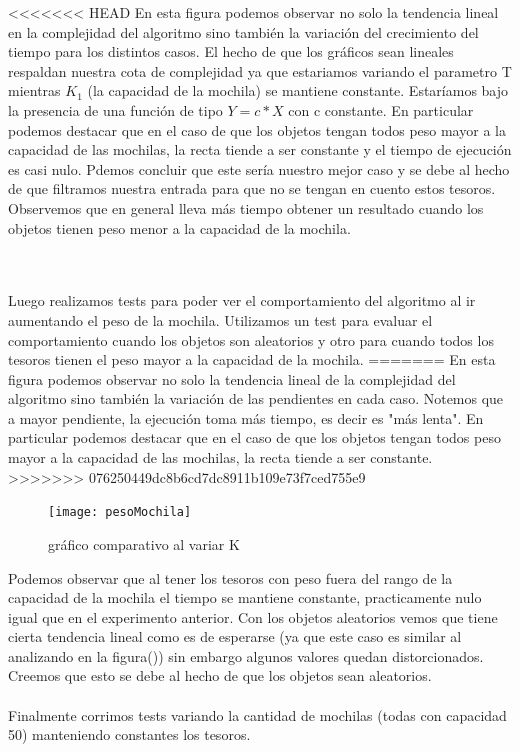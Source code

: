 \documentclass[spanish,12pt]{article}
\begin{document}
<<<<<<< HEAD
En esta figura podemos observar no solo la tendencia lineal en la complejidad del algoritmo sino también la variación del crecimiento del tiempo para los distintos casos.
El hecho de que los gráficos sean lineales respaldan nuestra cota de complejidad ya que estariamos variando el parametro T mientras $K_1$ (la capacidad de la mochila) se mantiene constante. Estaríamos bajo la presencia de una función de tipo $Y=c*X$ con c constante.
En particular podemos destacar que en el caso de que los objetos tengan todos peso mayor a la capacidad de las mochilas, la recta tiende a ser constante y el tiempo de ejecución es casi nulo.
Pdemos concluir que este sería nuestro mejor caso y se debe al hecho de que filtramos nuestra entrada para que no se tengan en cuento estos tesoros.
Observemos que en general lleva más tiempo obtener un resultado cuando los objetos tienen peso menor a la capacidad de la mochila.

\\
\\
Luego realizamos tests para poder ver el comportamiento del algoritmo al ir aumentando el peso de la mochila. Utilizamos un test para evaluar el comportamiento cuando los objetos son aleatorios y otro para cuando todos los tesoros tienen el peso mayor a la capacidad de la mochila.
=======
En esta figura podemos observar no solo la tendencia lineal de la complejidad del algoritmo sino también la variación de las pendientes en cada caso. Notemos que a mayor pendiente, la ejecución toma más tiempo, es decir	 es "más lenta".
En particular podemos destacar que en el caso de que los objetos tengan todos peso mayor a la capacidad de las mochilas, la recta tiende a ser constante.
>>>>>>> 076250449dc8b6cd7dc8911b109e73f7ced755e9

\begin{figure}[H]
\centering
\texttt{[image: pesoMochila]}
\caption{gráfico comparativo al variar K}
\end{figure}

Podemos observar que al tener los tesoros con peso fuera del rango de la capacidad de la mochila el tiempo se mantiene constante, practicamente nulo igual que en el experimento anterior. Con los objetos aleatorios vemos que tiene cierta tendencia lineal como es de esperarse (ya que este caso es similar al analizando en la figura()) sin embargo algunos valores quedan distorcionados. Creemos que esto se debe al hecho de que los objetos sean aleatorios.
\\
\\
Finalmente corrimos tests variando la cantidad de mochilas (todas con capacidad 50) manteniendo constantes los tesoros.
\end{document}
